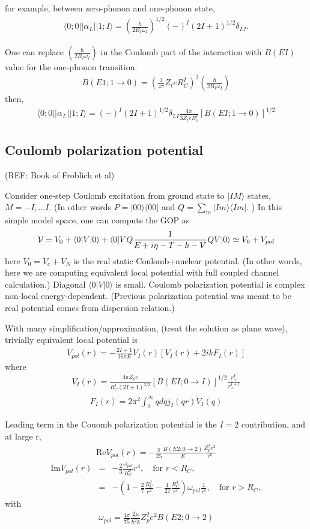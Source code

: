 \documentclass[11pt]{book}
\def\la{\langle}
\def\ra{\rangle}
\newcommand{\bea}{\begin{eqnarray}}
\newcommand{\eea}{\end{eqnarray}}
\newcommand{\no}{\nonumber \\}
\begin{document}
for example, between zero-phonon and one-phonon state,
\bea 
\la 0;0||\alpha_L||1;I\ra = (\frac{\hbar}{2B_I\omega_I})^{1/2}(-)^{I}(2I+1)^{1/2} \delta_{LI}. 
\eea 

One can replace $(\frac{\hbar}{2B_I\omega_I})$ 
in the Coulomb part of the interaction with $B(EI)$ value for the one-phonon transition.
\bea 
B(E1;1\to 0)=(\frac{3}{4\pi} Z_t e R_C^I)^2 (\frac{\hbar}{2B_I\omega_I})
\eea 
then,
\bea 
\la 0;0||\alpha_L||1;I\ra = (-)^I (2I+1)^{1/2} \delta_{LI}\frac{4\pi}{3 Z_t e R_c^I}[B(EI;1\to 0)]^{1/2}
\eea 

\subsection{Coulomb polarization potential}
(REF: Book of Froblich et al)

Consider one-step Coulomb excitation from ground state to $|I M\ra$ states, $M=-I,\dots I$. 
(In other words $P=|00\ra\la 00|$ and $Q=\sum_m|I m\ra\la Im|$. )
In this simple model space, one can compute the GOP as 
\bea 
{\cal V}=V_0+\la 0|V|0\ra+\la 0|V Q \frac{1}{E+i\eta-T-h-V} Q V|0\ra 
        \simeq V_0 +V_{pol}
\eea 
here $V_0=V_c+V_N$ is the real static Coulomb+nuclear potential. 
(In other words, here we are computing equivalent local potential 
with full coupled channel calculation.)
Diagonal $\la 0|V|0\ra $ is small. 
Coulomb polarization potential is complex non-local energy-dependent.
(Previous polarization potential was meant to be real potential
comes from dispersion relation.) 

With many simplification/approximation, (treat the solution as plane wave),
trivially equivalent local potential is 
\bea 
V_{pol}(r) = -\frac{2I+1}{16\pi E} V_I(r)[V_I(r)+ 2ik F_I(r)]
\eea 
where
\bea 
V_I(r) = \frac{4\pi Z_p e}{R_C^I (2I+1)^{3/2}}[B(EI;0\to I)]^{1/2} \frac{r_{<}^I}{r_{>}^{I+1}} 
\eea 
\bea 
F_I(r)=2\pi^2\int_0^\infty q dq j_I(qr)\tilde{V}_I(q)
\eea 

Leading term in the Couomb polarization potential is the $I=2$ contribution, and at large r,
\bea 
\mbox{Re} V_{pol}(r) = -\frac{\pi}{25}\frac{B(E2;0\to 2)}{E}\frac{Z_p^2 e^2}{r^6}
\eea 
\bea 
\mbox{Im} V_{pol}(r) &=& -\frac{2}{3}\frac{\omega_{pol}}{R_C^9}r^4 ,\quad \mbox{for } r< R_C,\no 
                &=& -(1-\frac{2}{7}\frac{R_C^2}{r^2}-\frac{1}{21}\frac{R_C^4}{r^4}) \omega_{pol} \frac{1}{r^5}, \quad \mbox{for } r> R_C,
\eea 
with 
\bea 
\omega_{pol} = \frac{4\pi}{75}\frac{2\mu}{\hbar^2 k} Z_p^2 e^2 B(E2;0\to 2)
\eea 
\end{document}
